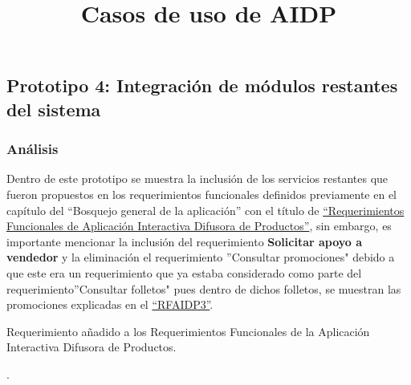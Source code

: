 \subsection{Prototipo 4: Integración de módulos restantes del sistema}
\subsubsection{Análisis}
\hypertarget{analisis1}{}
Dentro de este prototipo se muestra la inclusión de los servicios restantes que fueron propuestos en los requerimientos funcionales definidos previamente en el capítulo del ``Bosquejo general de la aplicación''  con el título de \hyperlink{RFAIDP}{``Requerimientos Funcionales de Aplicación Interactiva Difusora de Productos''}, sin embargo, es importante mencionar la inclusión del requerimiento \textbf{Solicitar apoyo a vendedor} y la eliminación el requerimiento ''Consultar promociones" debido a que este era un requerimiento que ya estaba considerado como parte del requerimiento''Consultar folletos" pues dentro de dichos folletos, se muestran las promociones explicadas en el \hyperlink{RFAIDP3}{``RFAIDP3''}.\\

\hypertarget{NRFAIDP}{}
\begin{FRequirements}


\caption{Requerimiento añadido a los Requerimientos Funcionales de la Aplicación Interactiva Difusora de Productos.}

\end{FRequirements}.
\newpage
\title{\textbf{Casos de uso de AIDP}\\ \par}

